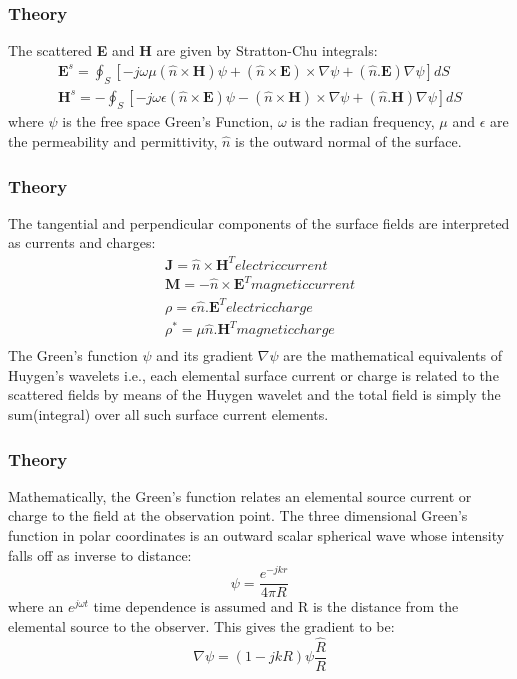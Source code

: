 \documentclass{beamer}
\begin{document}
\begin{frame}
\frametitle{Theory}
The scattered \textbf{E} and \textbf{H} are given by Stratton-Chu integrals:
\begin{eqnarray}
\textbf{E}^s = \oint_S[-j\omega\mu(\hat{n}\times\textbf{H})\psi + (\hat{n}\times\textbf{E})\times\nabla\psi + (\hat{n}.\textbf{E})\nabla\psi]dS \\
\textbf{H}^s = -\oint_S[-j\omega\epsilon(\hat{n}\times\textbf{E})\psi - (\hat{n}\times\textbf{H})\times\nabla\psi + (\hat{n}.\textbf{H})\nabla\psi]dS
\end{eqnarray}
where $\psi$ is the free space Green's Function, $\omega$ is the radian frequency, $\mu$ and $\epsilon$ are the permeability and permittivity, $\hat{n}$ is the outward normal of the surface.
\end{frame}
\begin{frame}
\frametitle{Theory}
The tangential and perpendicular components of the surface fields are interpreted as currents and charges:
\begin{eqnarray}
\textbf{J} = \hat{n}\times\textbf{H}^T electric current \\
\textbf{M} = -\hat{n}\times\textbf{E}^T magnetic current \\
\rho = \epsilon\hat{n}.\textbf{E}^T electric charge \\
\rho^* = \mu\hat{n}.\textbf{H}^T magnetic charge \\
\end{eqnarray}
The Green's function $\psi$ and its gradient $\nabla\psi$ are the mathematical equivalents of Huygen's wavelets i.e., each elemental surface current or charge is related to the scattered fields by means of the Huygen wavelet and the total field is simply the sum(integral) over all such surface current elements.
\end{frame}
\begin{frame}
\frametitle{Theory}
Mathematically, the Green's function relates an elemental source current or charge to the field at the observation point. The three dimensional Green's function in polar coordinates is an outward scalar spherical wave whose intensity falls off as inverse to distance:
\begin{equation}
\psi = \frac{e^{-jkr}}{4\pi R}
\end{equation}
where an $e^{j\omega t}$ time dependence is assumed and R is the distance from the elemental source to the observer. This gives the gradient to be:
\begin{equation}
\nabla\psi = (1 - jkR)\psi \frac{\hat{R}}{R}
\end{equation}
\end{frame}
\end{document}
